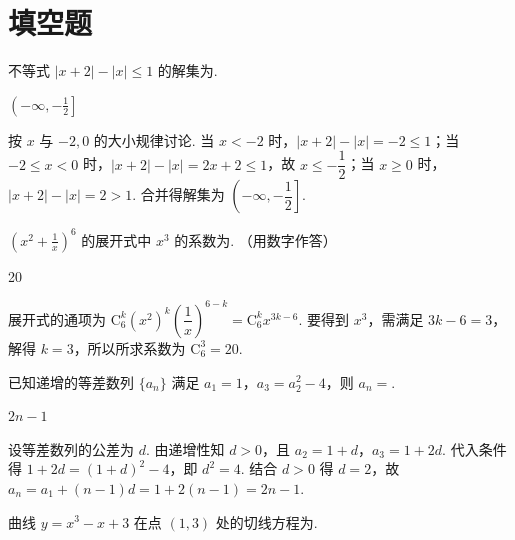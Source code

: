 \section{填空题}

\begin{problem}
不等式 \(|x + 2| - |x| \leqslant 1\) 的解集为\fillinblank{}.
\end{problem}

\begin{answer}
\(\left(-\infty,-\frac{1}{2}\right]\)
\end{answer}

\begin{solution}
按 \(x\) 与 \(-2,0\) 的大小规律讨论. 当 \(x<-2\) 时，\(|x+2|-|x|=-2\leqslant1\)；当 \(-2\leqslant x<0\) 时，\(|x+2|-|x|=2x+2\leqslant1\)，故 \(x\leqslant-\dfrac{1}{2}\)；当 \(x\geqslant0\) 时，\(|x+2|-|x|=2>1\). 合并得解集为 \(\left(-\infty,-\dfrac{1}{2}\right]\).
\end{solution}

\begin{problem}
\(\left(x^{2} + \frac{1}{x}\right)^{6}\) 的展开式中 \(x^{3}\) 的系数为\fillinblank{}. （用数字作答）
\end{problem}

\begin{answer}
20
\end{answer}

\begin{solution}
展开式的通项为 \(\mathrm C_6^k(x^2)^k\left(\dfrac{1}{x}\right)^{6-k}=\mathrm C_6^k x^{3k-6}\). 要得到 \(x^3\)，需满足 \(3k-6=3\)，解得 \(k=3\)，所以所求系数为 \(\mathrm C_6^3=20\).
\end{solution}

\begin{problem}
已知递增的等差数列 \(\{a_{n}\}\) 满足 \(a_{1} = 1\)，\(a_{3} = a_{2}^{2} - 4\)，则 \(a_{n} = \)\fillinblank{}.
\end{problem}

\begin{answer}
\(2n-1\)
\end{answer}

\begin{solution}
设等差数列的公差为 \(d\). 由递增性知 \(d>0\)，且 \(a_2=1+d\)，\(a_3=1+2d\). 代入条件得
\(1+2d=(1+d)^2-4\)，即 \(d^2=4\). 结合 \(d>0\) 得 \(d=2\)，故 \(a_n=a_1+(n-1)d=1+2(n-1)=2n-1\).
\end{solution}

\begin{problem}
曲线 \( y = x^{3} - x + 3 \) 在点 \( (1,3) \) 处的切线方程为\fillinblank{}.
\end{problem}


